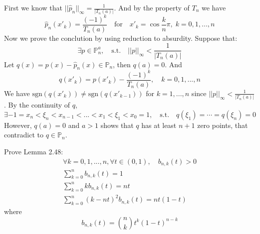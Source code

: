 \documentclass[11pt]{elegantbook}
\begin{document}
\begin{solution}
  First we know that $||\hat{p}_n||_\infty=\frac{1}{|T_n(a)|}$. And by the property of $T_n$ we have
  \begin{equation*}
    \hat{p}_n(x'_k) = \frac{(-1)^k}{T_n(a)} \quad \text{for} \quad x'_k=\cos\frac{k}{n}\pi,\;k=0,1,...,n
  \end{equation*}
  Now we prove the conclution by using reduction to absurdity. Suppose that:
  \begin{equation*}
    \exists p\in \mathbb{P}_n^a,\quad \text{s.t.} \quad ||p||_\infty<\frac{1}{|T_n(a)|}
  \end{equation*}
  Let $q(x)=p(x)-\hat{p}_n(x)\in \mathbb{P}_n$, then $q(a)=0$. And
  \begin{equation*}
    q(x'_k) = p(x'_k) - \frac{(-1)^k}{T_n(a)},\quad k=0,1,...,n
  \end{equation*}
  We have $\text{sgn}(q(x'_k))\neq \text{sgn}(q(x'_{k-1}))$ for $k=1,...,n$ since $||p||_\infty<\frac{1}{|T_n(a)|}$. By the continuity of $q$,
  \begin{equation*}
    \exists -1=x_n<\xi_n<x_{n-1}<...<x_{1}<\xi_1<x_0=1, \quad \text{s.t.} \quad q(\xi_1)=\cdots =q(\xi_n)=0
  \end{equation*}
  However, $q(a)=0$ and $a>1$ shows that $q$ has at least $n+1$ zero points, that contradict to $q\in\mathbb{P}_n$.
\end{solution}

\vspace{1.5em}

\begin{problem}
  Prove Lemma 2.48:
  \begin{align}
    \forall k=0,1,...,n, \forall t\in(0,1),\quad b_{n,k}(t)>0 \\
    \sum_{k=0}^n b_{n,k}(t)=1\\
    \sum_{k=0}^n kb_{n,k}(t) = nt\\
    \sum_{k=0}^n (k-nt)^2b_{n,k}(t)=nt(1-t)
  \end{align}
  where
  \begin{equation*}
    b_{n,k}(t) = \binom{n}{k}t^k(1-t)^{n-k}
  \end{equation*}
\end{problem}
\end{document}

